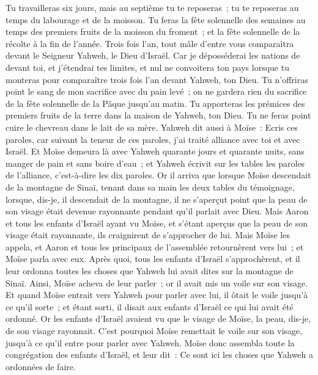 \begin{multicols}{2}
Tu travailleras six jours, mais au septième tu te reposeras~; tu te reposeras au temps du labourage et de la moisson.
Tu feras la fête solennelle des semaines au temps des premiers fruits de la moisson du froment~; et la fête solennelle de la récolte à la fin de l'année.
Trois fois l'an, tout mâle d'entre vous comparaîtra devant le Seigneur Yahweh, le Dieu d'Israël.
Car je déposséderai les nations de devant toi, et j'étendrai tes limites, et nul ne convoitera ton pays lorsque tu monteras pour comparaître trois fois l'an devant Yahweh, ton Dieu.
Tu n'offriras point le sang de mon sacrifice avec du pain levé~; on ne gardera rien du sacrifice de la fête solennelle de la Pâque jusqu'au matin.
Tu apporteras les prémices des premiers fruits de la terre dans la maison de Yahweh, ton Dieu. Tu ne feras point cuire le chevreau dans le lait de sa mère.
Yahweh dit aussi à Moïse~: Ecris ces paroles, car suivant la teneur de ces paroles, j'ai traité alliance avec toi et avec Israël.
Et Moïse demeura là avec Yahweh quarante jours et quarante nuits, sans manger de pain et sans boire d'eau~; et Yahweh écrivit sur les tables les paroles de l'alliance, c'est-à-dire les dix paroles.
Or il arriva que lorsque Moïse descendait de la montagne de Sinaï, tenant dans sa main les deux tables du témoignage, lorsque, dis-je, il descendait de la montagne, il ne s'aperçut point que la peau de son visage était devenue rayonnante pendant qu'il parlait avec Dieu.
Mais Aaron et tous les enfants d'Israël ayant vu Moïse, et s'étant aperçus que la peau de son visage était rayonnante, ils craignirent de s'approcher de lui.
Mais Moïse les appela, et Aaron et tous les principaux de l'assemblée retournèrent vers lui~; et Moïse parla avec eux.
Après quoi, tous les enfants d'Israël s'approchèrent, et il leur ordonna toutes les choses que Yahweh lui avait dites sur la montagne de Sinaï.
Ainsi, Moïse acheva de leur parler~; or il avait mis un voile sur son visage.
Et quand Moïse entrait vers Yahweh pour parler avec lui, il ôtait le voile jusqu'à ce qu'il sorte~; et étant sorti, il disait aux enfants d'Israël ce qui lui avait été ordonné.
Or les enfants d'Israël avaient vu que le visage de Moïse, la peau, dis-je, de son visage rayonnait. C'est pourquoi Moïse remettait le voile sur son visage, jusqu'à ce qu'il entre pour parler avec Yahweh.
\VerseOne{}Moïse donc assembla toute la congrégation des enfants d'Israël, et leur dit~: Ce sont ici les choses que Yahweh a ordonnées de faire.

\end{multicols}

